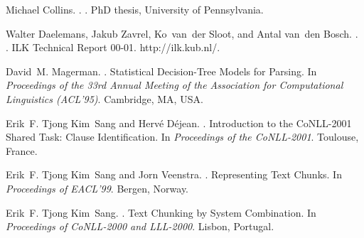 \documentclass[11pt]{article}
\begin{document}
\small

%
%

\begin{thebibliography}{}

Michael Collins.
.
.
\newblock PhD thesis, University of Pennsylvania.

Walter Daelemans, Jakub Zavrel, Ko~van~der Sloot, and Antal van~den Bosch.
.
.
\newblock ILK Technical Report 00-01.
\newblock http://ilk.kub.nl/.

David~M. Magerman.
.
\newblock Statistical Decision-Tree Models for Parsing.
\newblock In {\em Proceedings of the 33rd Annual Meeting of the Association for
  Computational Linguistics (ACL'95)}. Cambridge, MA, USA.

Erik~F. Tjong Kim~Sang and Herv{\'e} D{\'e}jean.
.
\newblock Introduction to the CoNLL-2001 Shared Task: Clause Identification.
\newblock In {\em Proceedings of the CoNLL-2001}. Toulouse, France.

Erik~F. Tjong Kim~Sang and Jorn Veenstra.
.
\newblock Representing Text Chunks.
\newblock In {\em Proceedings of EACL'99}. Bergen, Norway.

Erik~F. Tjong Kim~Sang.
.
\newblock Text Chunking by System Combination.
\newblock In {\em Proceedings of CoNLL-2000 and LLL-2000}. Lisbon, Portugal.

\end{thebibliography}
\end{document}
